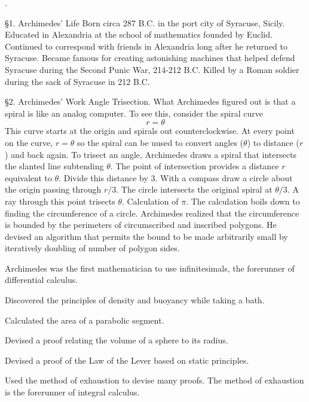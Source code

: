 .

\item{\S 1.}
Archimedes' Life
Born circa 287 B.C. in the port city of Syracuse, Sicily.
Educated in Alexandria at the school of mathematics founded by Euclid.
Continued to correspond with friends in Alexandria long after he returned
to Syracuse.
Became famous for creating astonishing machines that helped
defend Syracuse during the Second Punic War, 214-212 B.C.
Killed by a Roman soldier during the sack of Syracuse in 212 B.C.

\bigskip
\item{\S 2.} Archimedes' Work
 Angle Trisection.
What Archimedes figured out is that a spiral is like
an analog computer.
To see this, consider the spiral curve
$$r=\theta$$
This curve starts at the origin and spirals out counterclockwise.
At every point on the curve, $r=\theta$ so the spiral can be
uused to convert angles ($\theta$) to distance ($r$) and back again.
To trisect an angle, Archimedes draws a spiral that intersects the
slanted line subtending $\theta$.
The point of intersection provides a distance $r$ equivalent to $\theta$.
Divide this distance by 3.
With a compass draw a circle about the origin passing through $r/3$.
The circle intersects the original spiral at $\theta/3$.
A ray through this point trisects $\theta$.
Calculation of $\pi$.
The calculation boils down to finding the circumference of a circle.
Archimedes realized that the circumference is bounded by
the perimeters of circumscribed and inscribed polygons.
He devised an algorithm that permits the bound to
be made arbitrarily small by iteratively doubling of number
of polygon sides.

Archimedes was the first mathematician to use infinitesimals, the
forerunner of differential calculus.

Discovered the principles of density and buoyancy while taking a bath.

Calculated the area of a parabolic segment.

Devised a proof relating the volume of a sphere to its radius.

Devised a proof of the Law of the Lever based on static principles.

Used the method of exhaustion to devise many proofs.
The method of exhaustion is the forerunner of integral calculus.

